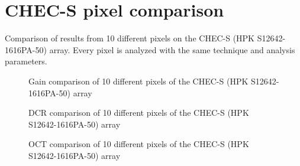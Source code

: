 \documentclass[12pt,article,type=msc,colorback,accentcolor=tud9c]{tudthesis}
\begin{document}
\clearpage
\section{CHEC-S pixel comparison}
\label{appsec:CHEC_S_multipixel}
Comparison of results from 10 different pixels on the CHEC-S (HPK S12642-1616PA-50) array. Every pixel is analyzed with the same technique and analysis parameters.

\begin{figure}[h]
\begin{centering}
\caption[CHEC-S pixel comparison of the gain]{Gain comparison of 10 different pixels of the CHEC-S (HPK S12642-1616PA-50) array}
\label{app:CHEC_S_multipixel_Gain}
\end{centering}
\end{figure}

\begin{figure}[h]
\begin{centering}
\caption[CHEC-S pixel comparison of the DCR]{DCR comparison of 10 different pixels of the CHEC-S (HPK S12642-1616PA-50) array}
\label{app:CHEC_S_multipixel_DCR}
\end{centering}
\end{figure}

\begin{figure}[ht]
\begin{centering}
\caption[CHEC-S pixel comparison of the OCT]{OCT comparison of 10 different pixels of the CHEC-S (HPK S12642-1616PA-50) array}
\label{app:CHEC_S_multipixel_OCT}
\end{centering}
\end{figure}
\end{document}
